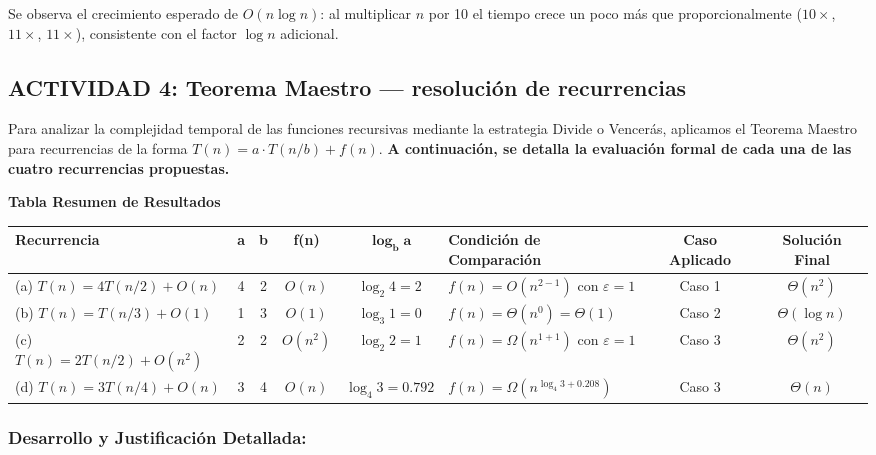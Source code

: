 \documentclass[12pt,a4paper]{article}
\begin{document}
\vspace{6pt}
Se observa el crecimiento esperado de $O(n \log n)$: al multiplicar $n$ por 10 el tiempo
crece un poco más que proporcionalmente ($10\times$, $11\times$, $11\times$), consistente
con el factor $\log n$ adicional.

\newpage
\subsection*{ACTIVIDAD 4: Teorema Maestro --- resolución de recurrencias}

Para analizar la complejidad temporal de las funciones recursivas mediante la estrategia
Divide o Vencerás, aplicamos el Teorema Maestro para recurrencias de la forma
$T(n) = a \cdot T(n/b) + f(n)$. \textbf{A continuación, se detalla la evaluación formal de
cada una de las cuatro recurrencias propuestas.}

\vspace{6pt}
\textbf{Tabla Resumen de Resultados}

\vspace{4pt}
\begin{center}
\renewcommand{\arraystretch}{1.5}
\scriptsize
\setlength{\tabcolsep}{3pt}
\begin{tabular}{|p{2.7cm}|c|c|c|c|p{2.5cm}|c|c|}
\hline
\textbf{Recurrencia} & \textbf{a} & \textbf{b} & \textbf{f(n)} & $\mathbf{\log_b a}$ &
\textbf{Condición de Comparación} & \textbf{Caso Aplicado} & \textbf{Solución Final} \\
\hline
(a) $T(n) = 4T(n/2) + O(n)$ & 4 & 2 & $O(n)$ & $\log_2 4 = 2$ &
$f(n) = O(n^{2-1})$ con $\varepsilon = 1$ & Caso 1 & $\Theta(n^2)$ \\
\hline
(b) $T(n) = T(n/3) + O(1)$ & 1 & 3 & $O(1)$ & $\log_3 1 = 0$ &
$f(n) = \Theta(n^0) = \Theta(1)$ & Caso 2 & $\Theta(\log n)$ \\
\hline
(c) $T(n) = 2T(n/2) + O(n^2)$ & 2 & 2 & $O(n^2)$ & $\log_2 2 = 1$ &
$f(n) = \Omega(n^{1+1})$ con $\varepsilon = 1$ & Caso 3 & $\Theta(n^2)$ \\
\hline
(d) $T(n) = 3T(n/4) + O(n)$ & 3 & 4 & $O(n)$ & $\log_4 3 = 0.792$ &
$f(n) = \Omega(n^{\log_4 3 + 0.208})$ & Caso 3 & $\Theta(n)$ \\
\hline
\end{tabular}
\setlength{\tabcolsep}{6pt}
\end{center}

\vspace{10pt}
\subsubsection*{Desarrollo y Justificación Detallada:}
\end{document}
